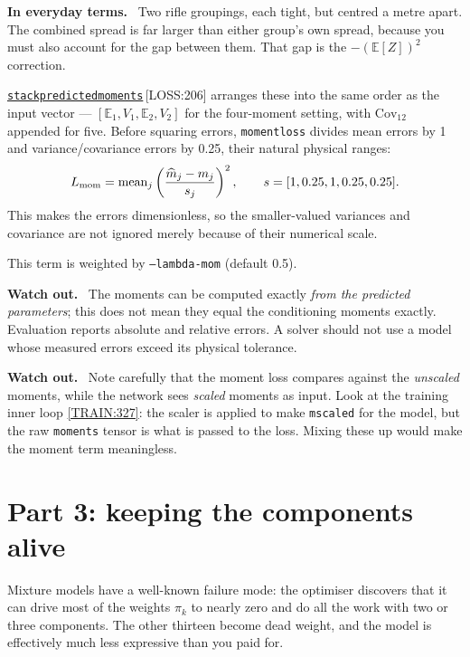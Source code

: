 \documentclass[11pt,a4paper]{report}
\newcommand{\srcbase}{vscode://file/Users/syellapa/Documents/Research/2026/ANSYS/Multi-ScalarPDF}
\newcommand{\dmdn}{dirichlet\string_mdn}
\newcommand{\srctag}[1]{{\footnotesize\textcolor{TagGray}{[#1]}}}
\newcommand{\Loss}[2]{\href{\srcbase/\dmdn/losses.py:#1}{\texttt{#2}}\,\srctag{LOSS:#1}}
\newcommand{\TrainL}[1]{\href{\srcbase/\dmdn/train.py:#1}{\srctag{TRAIN:#1}}}
\newcommand{\code}[1]{\texttt{#1}}
\renewcommand{\_}{\origtextunderscore\allowbreak}
\newlength{\calloutwidth}
\newcommand{\calloutOpen}{%
  \par\medskip\noindent
  \setlength{\calloutwidth}{\dimexpr\linewidth-2\fboxsep\relax}%
  \begin{lrbox}{\calloutbox}\begin{minipage}{\calloutwidth}}
\newcommand{\calloutClose}[1]{%
  \end{minipage}\end{lrbox}\colorbox{#1}{\usebox{\calloutbox}}\par\medskip}
\newenvironment{analogy}
  {\calloutOpen\textbf{In everyday terms.}\ }
  {\calloutClose{BoxBG}}
\newenvironment{caution}
  {\calloutOpen\textbf{Watch out.}\ }
  {\calloutClose{WarnBG}}
\begin{document}
\begin{analogy}
Two rifle groupings, each tight, but centred a metre apart. The combined spread is far larger
than either group's own spread, because you must also account for the gap between them. That
gap is the $-(\mathbb{E}[Z])^2$ correction.
\end{analogy}

\Loss{206}{stack\_predicted\_moments} arranges these into the same order as the input vector
--- $[\mathbb{E}_1, V_1, \mathbb{E}_2, V_2]$ for the four-moment setting, with
$\mathrm{Cov}_{12}$ appended for five. Before squaring errors, \code{moment\_loss} divides
mean errors by 1 and variance/covariance errors by 0.25, their natural physical ranges:
\[
  L_{\rm mom} = \operatorname{mean}_j
  \left(\frac{\widehat m_j-m_j}{s_j}\right)^2,\qquad
  s=[1,0.25,1,0.25,0.25].
\]
This makes the errors dimensionless, so the smaller-valued variances and covariance are not
ignored merely because of their numerical scale.

This term is weighted by \code{--lambda-mom} (default 0.5).

\begin{caution}
The moments can be computed exactly \emph{from the predicted parameters}; this does not mean
they equal the conditioning moments exactly. Evaluation reports absolute and relative errors.
A solver should not use a model whose measured errors exceed its physical tolerance.
\end{caution}

\begin{caution}
Note carefully that the moment loss compares against the \emph{unscaled} moments, while the
network sees \emph{scaled} moments as input. Look at the training inner loop \TrainL{327}: the
scaler is applied to make \code{m\_scaled} for the model, but the raw \code{moments} tensor is
what is passed to the loss. Mixing these up would make the moment term meaningless.
\end{caution}

\section{Part 3: keeping the components alive}

Mixture models have a well-known failure mode: the optimiser discovers that it can drive most
of the weights $\pi_k$ to nearly zero and do all the work with two or three components. The
other thirteen become dead weight, and the model is effectively much less expressive than you
paid for.
\end{document}
